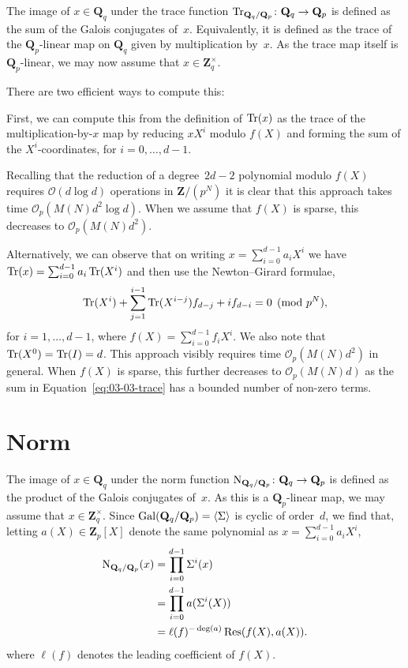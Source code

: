 The image of $x \in \mathbf{Q}_q$ under the trace function 
$\operatorname{Tr}_{\mathbf{Q}_q/\mathbf{Q}_p} \colon \mathbf{Q}_q \rightarrow \mathbf{Q}_p$ 
is defined as the sum of the Galois conjugates of~$x$.  Equivalently, 
it is defined as the trace of the $\mathbf{Q}_p$-linear map on 
$\mathbf{Q}_q$ given by multiplication by~$x$.  As the trace map 
itself is $\mathbf{Q}_p$-linear, we may now assume that 
$x \in \mathbf{Z}_q^{\times}$.

There are two efficient ways to compute this:

First, we can compute this from the definition of $\operatorname{Tr}(x)$ as the trace 
of the multiplication-by-$x$ map by reducing $x X^i$ modulo $f(X)$ and forming 
the sum of the $X^i$-coordinates, for $i = 0, \dotsc, d - 1$.

Recalling that the reduction of a degree~$2d-2$ polynomial modulo 
$f(X)$ requires $\mathcal{O}(d \log d)$ operations in $\mathbf{Z}/(p^N)$ 
it is clear that this approach takes time $\mathcal{O}_p(M(N) d^2 \log d)$. 
When we assume that $f(X)$ is sparse, this decreases to 
$\mathcal{O}_p(M(N) d^2)$.

Alternatively, we can observe that on writing $x = \sum_{i=0}^{d-1} a_i X^i$ 
we have $\operatorname{Tr}(x) = \sum_{i=0}^{d-1} a_i \operatorname{Tr}(X^i)$ and then use the 
Newton--Girard formulae,
\begin{equation} \label{eq:03-03-trace}
\operatorname{Tr}(X^i) + \sum_{j=1}^{i-1} \operatorname{Tr}(X^{i-j}) f_{d-j} + i f_{d-i} = 0 \pmod{p^N}, 
\end{equation}
for $i = 1, \dotsc, d-1$, where $f(X) = \sum_{i=0}^{d-1} f_i X^i$.  
We also note that $\operatorname{Tr}(X^0) = \operatorname{Tr}(I) = d$.  This approach visibly 
requires time $\mathcal{O}_p(M(N) d^2)$ in general.  When $f(X)$ is 
sparse, this further decreases to $\mathcal{O}_p(M(N) d)$ as the 
sum in Equation~\eqref{eq:03-03-trace} has a bounded number of 
non-zero terms.

\section{Norm}

The image of $x \in \mathbf{Q}_q$ under the norm function 
$\operatorname{N}_{\mathbf{Q}_q/\mathbf{Q}_p} \colon \mathbf{Q}_q \rightarrow \mathbf{Q}_p$ 
is defined as the product of the Galois conjugates of~$x$.  As this 
is a $\mathbf{Q}_p$-linear map, we may assume that 
$x \in \mathbf{Z}_q^{\times}$.  Since 
$\operatorname{Gal}(\mathbf{Q}_q/\mathbf{Q}_p) = \langle \Sigma \rangle$ is cyclic 
of order~$d$, we find that, letting $a(X) \in \mathbf{Z}_p[X]$ denote 
the same polynomial as $x = \sum_{i=0}^{d-1} a_i X^i$, 
\begin{equation}
\begin{split}
\operatorname{N}_{\mathbf{Q}_q/\mathbf{Q}_p} (x) & = \prod_{i=0}^{d-1} \Sigma^i (x) \\
                                      & = \prod_{i=0}^{d-1} a(\Sigma^i(X)) \\
                                      & = \ell(f)^{- \deg(a)} \operatorname{Res}(f(X), a(X)).
\end{split}
\end{equation}
where $\ell(f)$ denotes the leading coefficient of $f(X)$.  

